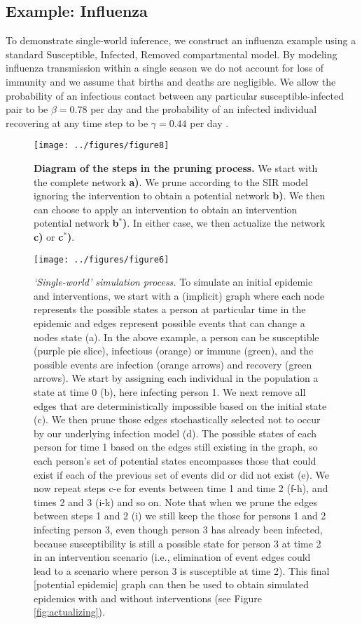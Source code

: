 \documentclass[PTRSB]{rsos}
\makeatletter
\def\checkGraphicsWidth{\ifdim\Gin@nat@width>\linewidth
	\tsGraphicsScaleX\linewidth\else\Gin@nat@width\fi}
\let\ts@includegraphics\includegraphics
\renewcommand{\includegraphics}[1]{\ts@includegraphics[width=\checkGraphicsWidth]{#1}}
\makeatother
\begin{document}
\begin{multicols}{2}
\subsection{Example: Influenza}
To demonstrate single-world inference, we construct an influenza example using a standard Susceptible, Infected, Removed compartmental model.
By modeling influenza transmission within a single season we do not account for loss of immunity and we assume that births and deaths are negligible.
We allow the probability of an infectious contact between any particular susceptible-infected pair to be $\beta = 0.78$ per day and the probability of an infected individual recovering at any time step to be $\gamma = 0.44$ per day \cite{forsberg-white-et-al:2009}.

\begin{figure}[hp]
\texttt{[image: ../figures/figure8]}
\caption{\textbf{Diagram of the steps in the pruning process.}  We start with the complete network \textbf{a)}.  We prune according to the SIR model ignoring the intervention to obtain a potential network \textbf{b)}.  We then can choose to apply an intervention to obtain an intervention potential network \textbf{b${}^*$)}.  In either case, we then actualize the network \textbf{c)} or \textbf{c${}^*$)}.}
\label{fig:outline}
\end{figure}

\begin{figure}[hp]
\texttt{[image: ../figures/figure6]}
\caption{\textit{‘Single-world’ simulation process.}
  To simulate an initial epidemic and interventions, we start with a (implicit) graph where each node represents the possible states a person at particular time in the epidemic and edges represent possible events that can change a nodes state (a).
  In the above example, a person can be susceptible (purple pie slice), infectious (orange) or immune (green), and the possible events are infection (orange arrows) and recovery (green arrows).
  We start by assigning each individual in the population a state at time 0 (b), here infecting person 1.
  We next remove all edges that are deterministically impossible based on the initial state (c).
  We then prune those edges stochastically selected not to occur by our underlying infection model (d).
  The possible states of each person for time 1 based on the edges still existing in the graph, so each person’s set of potential states encompasses those that could exist if each of the previous set of events did or did not exist (e).
  We now repeat steps c-e for events between time 1 and time 2 (f-h), and times 2 and 3 (i-k) and so on.
  Note that when we prune the edges between steps 1 and 2 (i) we still keep the those for persons 1 and 2 infecting person 3, even though person 3 has already been infected, because susceptibility is still a possible state for person 3 at time 2 in an intervention scenario (i.e., elimination of event edges could lead to a scenario where person 3 is susceptible at time 2).
  This final [potential epidemic] graph can then be used to obtain simulated epidemics with and without interventions (see Figure \ref{fig:actualizing}).
}
\label{fig:pruning}
\end{figure}


\end{multicols}
\end{document}
